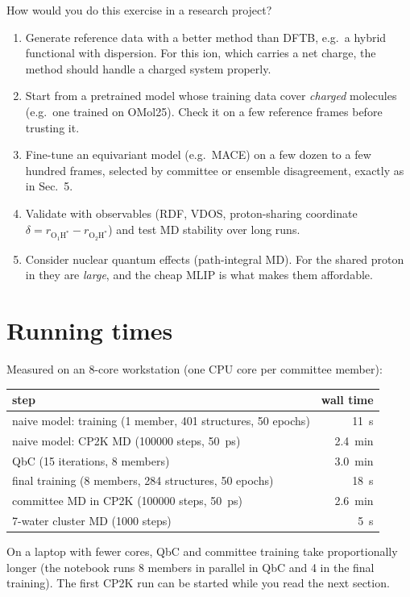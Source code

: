 \documentclass[11pt,a4paper]{article}
\begin{document}
\begin{nowbox}{How would you do this exercise in a research project?}
\begin{enumerate}[nosep,leftmargin=*]
  \item Generate reference data with a better method than DFTB, e.g.\ a hybrid
        functional with dispersion. For this ion, which carries a net charge,
        the method should handle a charged system properly.
  \item Start from a pretrained model whose training data cover \emph{charged}
        molecules (e.g.\ one trained on OMol25). Check it on a few reference
        frames before trusting it.
  \item Fine-tune an equivariant model (e.g.\ MACE) on a few dozen to a few
        hundred frames, selected by committee or ensemble disagreement, exactly
        as in Sec.~5.
  \item Validate with observables (RDF, VDOS, proton-sharing coordinate
        $\delta = r_{\mathrm{O_1H^*}}-r_{\mathrm{O_2H^*}}$) and test MD stability
        over long runs.
  \item Consider nuclear quantum effects (path-integral MD). For the shared
        proton in  they are \emph{large}, and the cheap MLIP is what
        makes them affordable.
\end{enumerate}
\end{nowbox}

\section{Running times}
Measured on an 8-core workstation (one CPU core per committee member):

\begin{center}\small
\begin{tabular}{@{}lr@{}}
\toprule
step & wall time\\
\midrule
naive model: training (1 member, 401 structures, 50 epochs) & \SI{11}{s}\\
naive model: CP2K MD (\num{100000} steps, \SI{50}{ps}) & \SI{2.4}{min}\\
QbC (15 iterations, 8 members) & \SI{3.0}{min}\\
final training (8 members, 284 structures, 50 epochs) & \SI{18}{s}\\
committee MD in CP2K (\num{100000} steps, \SI{50}{ps}) & \SI{2.6}{min}\\
7-water cluster MD (1000 steps) & \SI{5}{s}\\
\bottomrule
\end{tabular}
\end{center}
On a laptop with fewer cores, QbC and committee training take proportionally
longer (the notebook runs 8 members in parallel in QbC and 4 in the final
training). The first CP2K run can be started while you read the next section.
\end{document}
